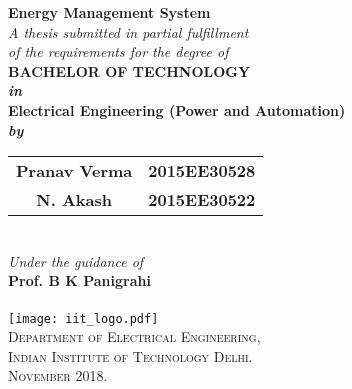 \begin{titlepage}
\begin{center}

\LARGE{\textsf{\bfseries Energy Management System}}\\
\vspace{20pt}
\normalsize
\emph{A thesis submitted in partial fulfillment} \\
\emph{of the requirements for the degree of} \\
\vspace{20pt}
\bfseries BACHELOR OF TECHNOLOGY \\
\vspace{20pt}
\emph {in}\\
\vspace{20pt}
\bfseries Electrical Engineering (Power and Automation) \\
\vspace{20pt}
\emph {by}\\
\vspace{20pt}
\begin{center}
\begin{tabular}{ c c }
 \Large{\textsf{\bfseries Pranav Verma}} & \Large{\textsf{\bfseries 2015EE30528}} \\ 
\Large{\textsf{\bfseries N. Akash }} & \Large{\textsf{\bfseries 2015EE30522}} \\
\end{tabular}
\end{center}

\ \\
{\normalsize \emph {Under the guidance of}}
\ \\
\Large{\textsf{\bfseries Prof. B K Panigrahi}} \\
\ \\
\vspace{30pt}
\texttt{[image: iit\_logo.pdf]} \\
\vspace{10pt}
\large{\textsc{Department of Electrical Engineering,\\
Indian Institute of Technology Delhi.\\ November 2018.}}
\end{center}
\end{titlepage}